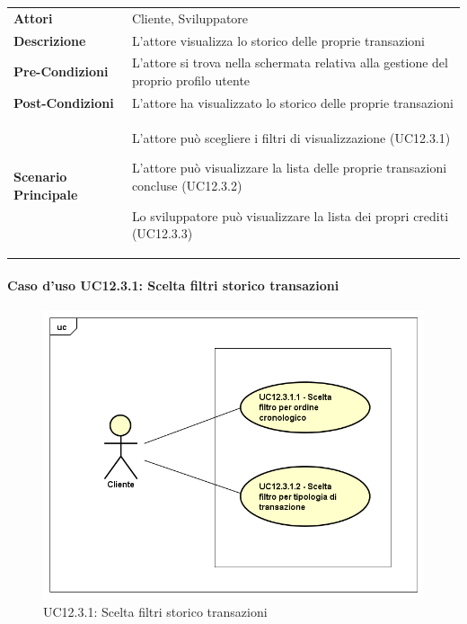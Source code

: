 \begin{minipage}{\linewidth}
	\begin{tabular}{ l | p{11cm}}
		\hline
		\rowcolor{Gray}
		\multicolumn{2}{c}{UC12.3 - Visualizzazione storico transazioni} \\
		\hline
		\textbf{Attori} & Cliente, Sviluppatore \\
		\textbf{Descrizione} & L'attore visualizza lo storico delle proprie transazioni \\
		\textbf{Pre-Condizioni} & L'attore si trova nella schermata relativa alla gestione del proprio profilo utente \\
		\textbf{Post-Condizioni} & L'attore ha visualizzato lo storico delle proprie transazioni \\
		\textbf{Scenario Principale} & 
		\begin{enumerate*}[label=(\arabic*.),itemjoin={\newline}]
			\item L'attore può scegliere i filtri di visualizzazione (UC12.3.1)
			\item L'attore può visualizzare la lista delle proprie transazioni concluse (UC12.3.2)
			\item Lo sviluppatore può visualizzare la lista dei propri crediti (UC12.3.3)
		\end{enumerate*}
	\end{tabular}
\end{minipage}

\newpage
\paragraph{Caso d'uso UC12.3.1: Scelta filtri storico transazioni}
\label{UC12_3_1}
\begin{figure}[ht]
	\centering
	\includegraphics[scale=0.45]{UML/UC12_3_1.png}
	\caption{UC12.3.1: Scelta filtri storico transazioni}
\end{figure}


